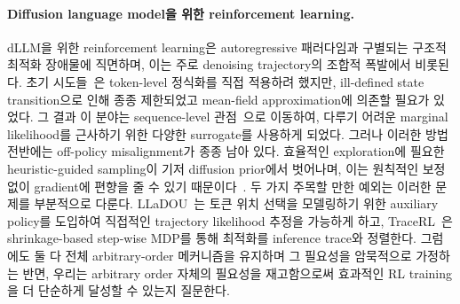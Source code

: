 \paragraph{Diffusion language model을 위한 reinforcement learning.} dLLM을 위한 reinforcement learning은 autoregressive 패러다임과 구별되는 구조적 최적화 장애물에 직면하며, 이는 주로 denoising trajectory의 조합적 폭발에서 비롯된다. 초기 시도들~\cite{zhao2025d1,yang2025mmada,gong2025diffucoder}은 token-level 정식화를 직접 적용하려 했지만, ill-defined state transition으로 인해 종종 제한되었고 mean-field approximation에 의존할 필요가 있었다. 그 결과 이 분야는 sequence-level 관점~\cite{wang2025spg,rojas2025improving,ou2025principled}으로 이동하여, 다루기 어려운 marginal likelihood를 근사하기 위한 다양한 surrogate를 사용하게 되었다. 그러나 이러한 방법 전반에는 off-policy misalignment가 종종 남아 있다. 효율적인 exploration에 필요한 heuristic-guided sampling이 기저 diffusion prior에서 벗어나며, 이는 원칙적인 보정 없이 gradient에 편향을 줄 수 있기 때문이다~\cite{schulman2015trust}.
두 가지 주목할 만한 예외는 이러한 문제를 부분적으로 다룬다. LLaDOU~\cite{huang2025reinforcing}는 토큰 위치 선택을 모델링하기 위한 auxiliary policy를 도입하여 직접적인 trajectory likelihood 추정을 가능하게 하고, TraceRL~\cite{wang2025revolutionizing}은 shrinkage-based step-wise MDP를 통해 최적화를 inference trace와 정렬한다. 그럼에도 둘 다 전체 arbitrary-order 메커니즘을 유지하며 그 필요성을 암묵적으로 가정하는 반면, 우리는 arbitrary order 자체의 필요성을 재고함으로써 효과적인 RL training을 더 단순하게 달성할 수 있는지 질문한다.
